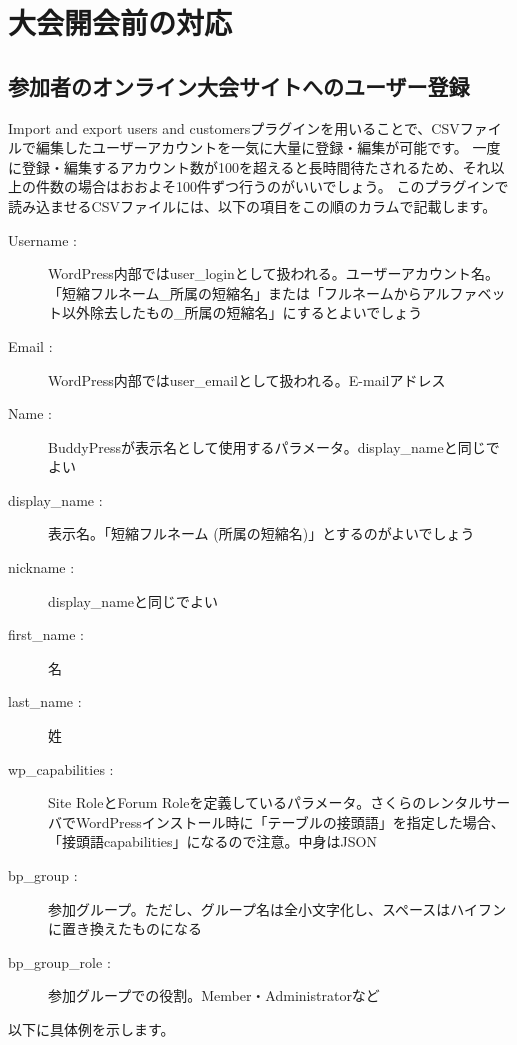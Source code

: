 \documentclass[titlepage,10pt,a4paper,uplatex]{jsbook}
\begin{document}
\section{大会開会前の対応}

\subsection{参加者のオンライン大会サイトへのユーザー登録}

Import and export users and customersプラグインを用いることで、CSVファイルで編集したユーザーアカウントを一気に大量に登録・編集が可能です。
一度に登録・編集するアカウント数が100を超えると長時間待たされるため、それ以上の件数の場合はおおよそ100件ずつ行うのがいいでしょう。
このプラグインで読み込ませるCSVファイルには、以下の項目をこの順のカラムで記載します。

\begin{description}
\item[Username : ] WordPress内部ではuser\_loginとして扱われる。ユーザーアカウント名。「短縮フルネーム\_所属の短縮名」または「フルネームからアルファベット以外除去したもの\_所属の短縮名」にするとよいでしょう
\item[Email : ] WordPress内部ではuser\_emailとして扱われる。E-mailアドレス
\item[Name : ] BuddyPressが表示名として使用するパラメータ。display\_nameと同じでよい
\item[display\_name : ] 表示名。「短縮フルネーム (所属の短縮名)」とするのがよいでしょう
\item[nickname : ] display\_nameと同じでよい
\item[first\_name : ] 名
\item[last\_name : ] 姓
\item[wp\_capabilities : ] Site RoleとForum Roleを定義しているパラメータ。さくらのレンタルサーバでWordPressインストール時に「テーブルの接頭語」を指定した場合、「接頭語capabilities」になるので注意。中身はJSON
\item[bp\_group : ] 参加グループ。ただし、グループ名は全小文字化し、スペースはハイフンに置き換えたものになる
\item[bp\_group\_role : ] 参加グループでの役割。Member・Administratorなど
\end{description}

以下に具体例を示します。
\end{document}
